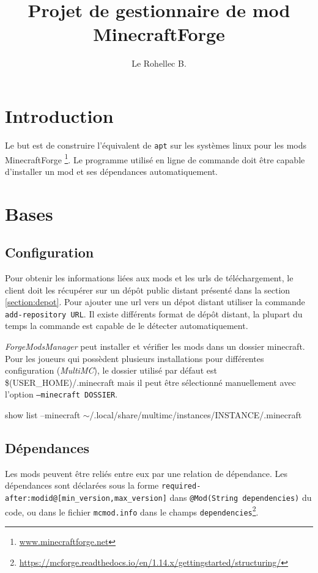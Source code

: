 \documentclass{article}
\title{Projet de gestionnaire de mod MinecraftForge}
\author{Le Rohellec B.}
\newenvironment{code}{%
\par
\vspace{3mm}
\ttfamily
}{%
\normalfont
\vspace{3mm}
\par
}
\begin{document}
\maketitle
\tableofcontents
\newpage


\section*{Introduction}
Le but est de construire l'équivalent de \texttt{apt} sur les systèmes linux pour les mods MinecraftForge \footnote{\url{www.minecraftforge.net}}.
Le programme utilisé en ligne de commande doit être capable d'installer un mod et ses dépendances automatiquement.

%
%
\section{Bases}
\label{section:bases}
\subsection{Configuration}
Pour obtenir les informations liées aux mods et les urls de téléchargement, le client doit les récupérer sur un dépôt public distant présenté dans la section \ref{section:depot}.
Pour ajouter une url vers un dépot distant utiliser la commande \texttt{add-repository URL}.
Il existe différents format de dépôt distant, la plupart du temps la commande est capable de le détecter automatiquement.

\textit{ForgeModsManager} peut installer et vérifier les mods dans un dossier minecraft.
Pour les joueurs qui possèdent plusieurs installations pour différentes configuration (\textit{MultiMC}), le dossier utilisé par défaut est \textsf{\$(USER\_HOME)/.minecraft} mais il peut être sélectionné manuellement avec l'option \texttt{--minecraft DOSSIER}.

\begin{code}
	show list --minecraft $\sim$/.local/share/multimc/instances/INSTANCE/.minecraft
\end{code}

\subsection{Dépendances}
Les mods peuvent être reliés entre eux par une relation de dépendance.
Les dépendances sont déclarées sous la forme \verb|required-after:modid@[min_version,max_version]| dans \verb|@Mod(String dependencies)| du code, ou dans le fichier \texttt{mcmod.info} dans le champs \texttt{dependencies}\footnote{\url{https://mcforge.readthedocs.io/en/1.14.x/gettingstarted/structuring/}}.
\end{document}
